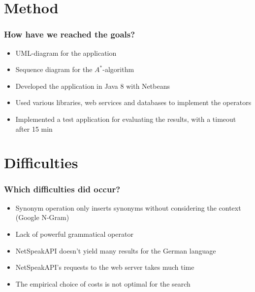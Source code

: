 \documentclass{beamer}
\begin{document}
\section{Method}
\begin{frame}
\frametitle{How have we reached the goals?}
\begin{itemize}
	\item UML-diagram for the application
	\item Sequence diagram for the $A^*$-algorithm
	\item Developed the application in Java 8 with Netbeans
	\item Used various libraries, web services and databases to implement
	the operators
	\item Implemented a test application for evaluating the results, with
	a timeout after 15 min

	
	
\end{itemize}
\end{frame}


\section{Difficulties}
\begin{frame}
\frametitle{Which difficulties did occur?}
\begin{itemize}
	\item Synonym operation only inserts synonyms without considering
	the context (Google N-Gram)
	\item Lack of powerful grammatical operator
	\item NetSpeakAPI doesn't yield many results for the German language
	\item NetSpeakAPI's requests to the web server takes much time
	\item The empirical choice of costs is not optimal for the search
\end{itemize}
\end{frame}
\end{document}
